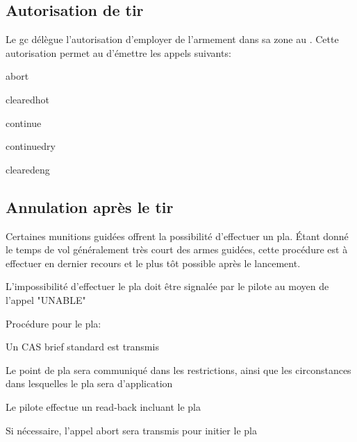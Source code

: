 
\newpage
\subsection{Autorisation de tir}

Le \gls{gc} délègue l'autorisation d'employer de l'armement dans sa zone au \ja{}. Cette autorisation permet au \ja{} d'émettre les appels suivants:


\e
	\item \acrfull{abort} 
	\item \acrfull{clearedhot}
	\item \acrfull{continue}
	\item \acrfull{continuedry}
	\item \acrfull{clearedeng}
\ed

\subsection{Annulation après le tir}

Certaines munitions guidées offrent la possibilité d'effectuer un \gls{pla}. Étant donné le temps de vol généralement très court des armes guidées, cette procédure est à effectuer en dernier recours et le plus tôt possible après le lancement.

\e
	\item L'impossibilité d'effectuer le \gls{pla} doit être signalée par le pilote au moyen de l'appel "UNABLE"
	\item Procédure pour le \gls{pla}:
	\ee
		\item Un CAS brief standard est transmis
		\item Le point de \gls{pla} sera communiqué dans les restrictions, ainsi que les circonstances dans lesquelles le \gls{pla} sera d'application
		\item Le pilote effectue un read-back incluant le \gls{pla}
		\item Si nécessaire, l'appel \gls{abort} sera transmis pour initier le \gls{pla}
	\ed
\ed

